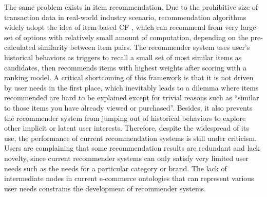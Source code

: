 The same problem exists in item recommendation. 
Due to the prohibitive size of transaction data in real-world industry scenario, recommendation algorithms widely adopt the 
idea of item-based CF \cite{sarwar2001item}, which
can recommend from very large set of options with relatively small amount of computation, 
depending on the pre-calculated similarity between item pairs.
The recommender system uses user's historical behaviors as triggers to recall a small set of most similar items as candidates, 
then recommends items with highest weights after scoring with a ranking model.
A critical shortcoming of this framework is that it is not driven by user needs in the first place, 
which inevitably leads to a dilemma where items recommended are hard to be explained 
except for trivial reasons such as ``similar to those items you have already viewed or purchased''.
Besides, it also prevents the recommender system from jumping out of 
historical behaviors to explore other implicit or latent user interests.
Therefore, despite the widespread of its use,
the performance of current recommendation systems is still under criticism. 
Users are complaining that some recommendation results are redundant and lack novelty, 
since current recommender systems can only satisfy very limited user needs such as the needs for a particular category or brand.
The lack of intermediate nodes in current e-commerce ontologies that can represent various user needs constrains the development of recommender systems.



